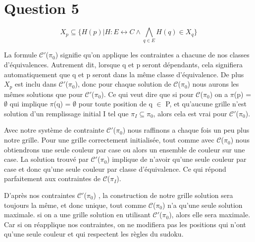
\section{Question 5}

$$X_p \subseteq \lbrace H(p) \vert H : E \leftrightarrow C \wedge \bigwedge_{q \in E} H(q) \in X_q \rbrace$$

La formule $\mathcal{C'}$($\pi_0$) signifie qu'on applique les contraintes a chacune de nos classes d'\'equivalences.
Autrement dit, lorsque q et p seront d\'ependants, cela signifiera automatiquement que q et p seront dans la m\^eme classe d'\'equivalence.  De plus $X_p$ est inclu dans $\mathcal{C'}$($\pi_0$), donc pour chaque solution de $\mathcal{C}$($\pi_0$) nous aurons les m\^emes solutions que pour $\mathcal{C'}$($\pi_0$). Ce qui veut dire que si pour $\mathcal{C}$($\pi_0$) on a $\pi$(p) = $\emptyset$ qui implique $\pi$(q) = $\emptyset$ pour toute position de q $\in$ P, et qu'aucune grille n'est solution d'un remplissage initial I tel que $\pi_I \subseteq \pi_0$, alors cela est vrai pour $\mathcal{C'}$($\pi_0$).

\bigskip
Avec notre syst\`eme de contrainte $\mathcal{C'}$($\pi_0$) nous raffinons a chaque fois un peu plus notre grille. Pour une grille correctement initialis\'ee, tout comme avec $\mathcal{C}$($\pi_0$) nous obtiendrons une seule couleur par case ou alors un ensemble de couleur sur une case. La solution trouv\'e par $\mathcal{C'}$($\pi_0$) implique de n'avoir qu'une seule couleur par case et donc qu'une seule couleur par classe d'\'equivalence. Ce qui r\'epond parfaitement aux contraintes de $\mathcal{C}$($\pi_I$).

\bigskip
D'apr\`es nos contraintes $\mathcal{C'}$($\pi_0$) , la construction de notre grille solution sera toujours la m\^eme, et donc unique, tout comme $\mathcal{C}$($\pi_0$) n'a qu'une seule solution maximale. si on a une grille solution en utilisant $\mathcal{C'}$($\pi_0$), alors elle sera maximale. Car si on r\'eapplique nos contraintes, on ne modifiera pas les positions qui n'ont qu'une seule couleur et qui respectent les r\`egles du sudoku.
